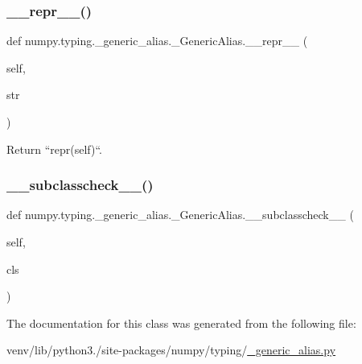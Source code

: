 \subsubsection{\texorpdfstring{\+\_\+\+\_\+repr\+\_\+\+\_\+()}{\_\_repr\_\_()}}
{\footnotesize\ttfamily def numpy.\+typing.\+\_\+generic\+\_\+alias.\+\_\+\+Generic\+Alias.\+\_\+\+\_\+repr\+\_\+\+\_\+ (\begin{DoxyParamCaption}\item[{}]{self,  }\item[{}]{str }\end{DoxyParamCaption})}

\begin{DoxyVerb}Return ``repr(self)``.\end{DoxyVerb}
 \mbox{\label{classnumpy_1_1typing_1_1__generic__alias_1_1__GenericAlias_a99d1fa7e7efd3e12ffa7ba817b64de58}} 
\subsubsection{\texorpdfstring{\+\_\+\+\_\+subclasscheck\+\_\+\+\_\+()}{\_\_subclasscheck\_\_()}}
{\footnotesize\ttfamily def numpy.\+typing.\+\_\+generic\+\_\+alias.\+\_\+\+Generic\+Alias.\+\_\+\+\_\+subclasscheck\+\_\+\+\_\+ (\begin{DoxyParamCaption}\item[{}]{self,  }\item[{}]{cls }\end{DoxyParamCaption})}



The documentation for this class was generated from the following file\+:\begin{DoxyCompactItemize}
\item 
venv/lib/python3./site-\/packages/numpy/typing/\hyperlink{__generic__alias_8py}{\+\_\+generic\+\_\+alias.\+py}\end{DoxyCompactItemize}
